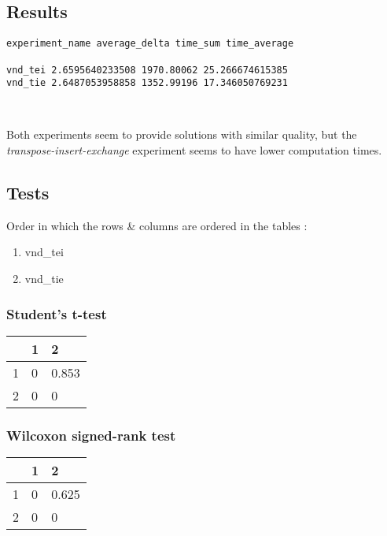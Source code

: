 \subsection{Results}

\begin{lstlisting}
experiment_name average_delta time_sum time_average

vnd_tei 2.6595640233508 1970.80062 25.266674615385
vnd_tie 2.6487053958858 1352.99196 17.346050769231
\end{lstlisting}
\

Both experiments seem to provide solutions with similar quality, but the
\emph{transpose-insert-exchange} experiment seems to have lower computation
times.

\newpage

\subsection{Tests}

\noindent Order in which the rows \& columns are ordered in the tables :

\begin{enumerate}
    \itemsep-0.5em
    \item vnd\_tei
    \item vnd\_tie
\end{enumerate}

\subsubsection{Student's t-test}

\begin{table}[h]
\begin{tabular}{|l||l|l|}
\hline
 & 1 & 2 \\ \hline
\hline
1 & 0 & 0.853 \\ \hline
2 & 0 & 0 \\ \hline
\end{tabular}
\end{table}

\subsubsection{Wilcoxon signed-rank test}

\begin{table}[h]
\begin{tabular}{|l||l|l|}
\hline
 & 1 & 2 \\ \hline
\hline
1 & 0 & 0.625 \\ \hline
2 & 0 & 0 \\ \hline
\end{tabular}
\end{table}

\newpage

